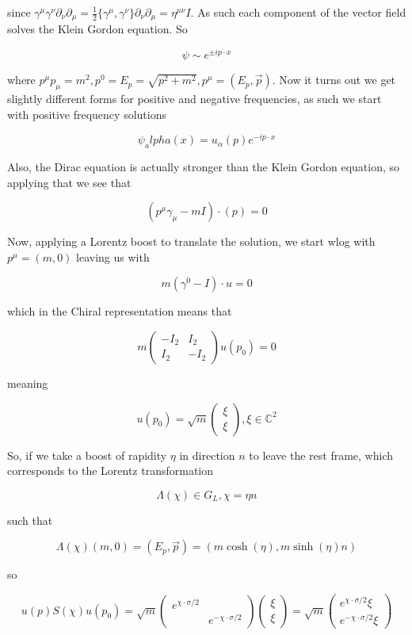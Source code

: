 \documentclass{article}
\theoremstyle{definition}
\begin{document}
since $\gamma^\mu \gamma^\nu \partial_\nu \partial_\mu = \frac{1}{2}
\{\gamma^\mu, \gamma^\nu\} \partial_\nu \partial_\mu = \eta^{\mu \nu} I$. As
such each component of the vector field solves the Klein Gordon equation.
So

$$ \psi \sim e^{\pm i p \cdot x} $$

where $p^\mu p_\mu = m^2, p^0 = E_p = \sqrt{p^2 + m^2}, p^\mu = (E_p,
\vec{p})$. Now it turns out we get slightly different forms for positive and
negative frequencies, as such we start with positive frequency solutions

$$ \psi_alpha(x) = u_\alpha(p) e^{-i p \cdot x} $$

Also, the Dirac equation is actually stronger than the Klein Gordon equation, so
applying that we see that

$$ (p^\mu \gamma_\mu - mI) \cdot (p) = 0 $$

Now, applying a Lorentz boost to translate the solution, we start wlog with
$p^\mu = (m, 0)$ leaving us with

$$ m(\gamma^0 - I) \cdot u = 0 $$

which in the Chiral representation means that

$$ m
\begin{pmatrix}
  -I_2 & I_2 \\
  I_2 & -I_2
\end{pmatrix}
u(p_0) = 0 $$

meaning

$$ u(p_0) = \sqrt{m}
\begin{pmatrix}
  \xi \\
  \xi
\end{pmatrix}
, \xi \in \mathbb{C}^2 $$

So, if we take a boost of rapidity $\eta$ in direction $n$ to leave the rest
frame, which corresponds to the Lorentz transformation

$$ \Lambda(\chi) \in G_L, \chi = \eta n $$

such that

$$ \Lambda(\chi) (m, 0) = (E_p, \vec{p}) = (m \cosh(\eta), m \sinh(\eta) n) $$

so

$$ u(p) S(\chi) u(p_0) = \sqrt{m}
\begin{pmatrix}
  e^{\chi \cdot \sigma / 2} & \\
  & e^{-\chi \cdot \sigma / 2}
\end{pmatrix}
\begin{pmatrix}
  \xi \\
  \xi
\end{pmatrix} = \sqrt{m}
\begin{pmatrix}
  e^{\chi \cdot \sigma / 2} \xi \\
  e^{-\chi \cdot \sigma / 2} \xi
\end{pmatrix}
$$
\end{document}
